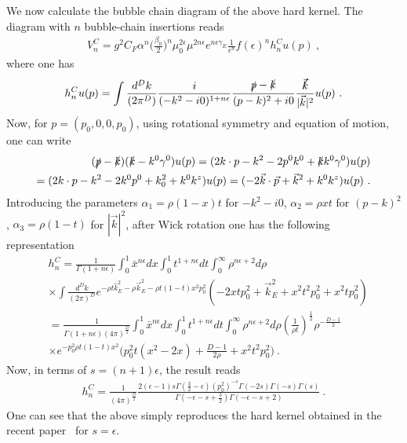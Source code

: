 \documentclass[a4paper,11pt]{article}
\begin{document}
We now calculate the bubble chain diagram of the above hard kernel. The diagram with $n$ bubble-chain insertions reads
\begin{align}
V_n^{C}=g^2C_F\alpha^n\bigg(\frac{\beta_0}{2}\bigg)^n\mu_0^{2\epsilon}\mu^{2n\epsilon}e^{n\epsilon \gamma_E}\frac{1}{\epsilon^n}f(\epsilon)^n h^C_n u(p) \ ,
\end{align}
where one has
\begin{align}
h^C_n u(p)=\int \frac{d^Dk}{(2\pi^D)}\frac{i}{(-k^2-i0)^{1+n\epsilon}}\frac{\slashed{p}-\slashed{k}}{(p-k)^2+i0}\frac{\slashed{\vec{k}}}{|\vec{k}|^2}u(p) \ .
\end{align}
Now, for $p=(p_0,0,0,p_0)$, using rotational symmetry and equation of motion, one can write 
\begin{align}
(\slashed{p}-\slashed{k})(\slashed{k}-k^0\gamma^0)u(p)=(2k\cdot p-k^2-2p^0k^0+\slashed{k}k^0\gamma^0)u(p) \nonumber \\ 
=(2k\cdot p-k^2-2k^0p^0+k_0^2+k^0k^z)u(p)=(-2\vec{k}\cdot \vec{p}+\vec{k}^2+k^0k^z)u(p) \ .
\end{align}
Introducing the parameters $\alpha_1=\rho(1-x)t$ for $-k^2-i0$, $\alpha_2=\rho x t$ for $(p-k)^2$, $\alpha_3=\rho(1-t)$ for $|\vec{k}|^2$, after Wick rotation one has the following representation
\begin{align}
&h_n^C=\frac{1}{\Gamma(1+n\epsilon)}\int_{0}^1 \bar x^{n\epsilon}dx \int_{0}^1 t^{1+n\epsilon}dt \int_{0}^{\infty}\rho^{n\epsilon+2}d\rho \nonumber \\ 
& \times \int \frac{d^Dk}{(2\pi)^D}e^{-\rho t \hat k_E^2-\rho \vec{k}_E^2-\rho t(1-t)x^2p_0^2}(-2xt p_0^2+\vec{k}_E^2+x^2t^2p_0^2+x^2t p_0^2) \nonumber \\ 
&=\frac{1}{\Gamma(1+n\epsilon)(4\pi)^{\frac{D}{2}}}\int_{0}^1 \bar x^{n\epsilon}dx \int_{0}^1 t^{1+n\epsilon}dt \int_{0}^{\infty}\rho^{n\epsilon+2}d\rho \left(\frac{1}{\rho t}\right)^{\frac{1}{2}}\rho^{-\frac{D-1}{2}} \nonumber \\ 
& \times e^{-p_0^2\rho t(1-t)x^2}\bigg(p_0^2t(x^2-2x)+\frac{D-1}{2\rho}+x^2t^2p_0^2\bigg) \ .
\end{align}
Now, in terms of $s=(n+1)\epsilon$, the result reads
\begin{align}
h_n^C=\frac{1}{(4\pi)^{\frac{D}{2}}}\frac{2 (\epsilon-1) s \Gamma \left(\frac{3}{2}-\epsilon\right) \left(p_0^2\right)^{-s} \Gamma (-2 s) \Gamma (-s) \Gamma (s) }{\Gamma \left(-\epsilon-s+\frac{3}{2}\right) \Gamma (-\epsilon-s+2)} \ .
\end{align}
One can see that the above simply reproduces the hard kernel obtained in the recent paper~\cite{Zhao:2023ptv} for $s=\epsilon$.
\end{document}
